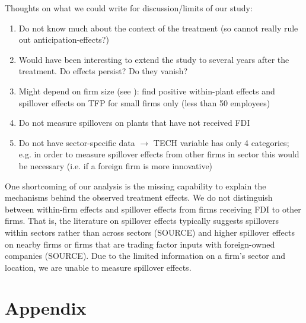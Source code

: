 \documentclass[a4paper,11pt]{scrartcl}
\newcommand{\sectionnumbering}[1]{%
  \setcounter{section}{0}%
   \renewcommand{\thesection}{\csname #1\endcsname{section}}}
\begin{document}
Thoughts on what we could write for discussion/limits of our study: 
\begin{enumerate}
\item Do not know much about the context of the treatment (so cannot really rule out anticipation-effects?)
\item Would have been interesting to extend the study to several years after the treatment. Do effects persist? Do they vanish? 
\item Might depend on firm size (see \citet{aitken99}): find positive within-plant effects and spillover effects on TFP for small firms only (less than 50 employees)
\item Do not measure spillovers on plants that have not received FDI
\item Do not have sector-specific data $\rightarrow$ TECH variable has only 4 categories; e.g. in order to measure spillover effects from other firms in sector this would be necessary (i.e. if a foreign firm is more innovative)
\end{enumerate}

One shortcoming of our analysis is the missing capability to explain the mechanisms behind the observed treatment effects. We do not distinguish between within-firm effects and spillover effects from firms receiving FDI to other firms. That is, the literature on spillover effects typically suggests spillovers within sectors rather than across sectors (SOURCE) and higher spillover effects on nearby firms or firms that are trading factor inputs with foreign-owned companies (SOURCE). Due to the limited information on a firm's sector and location, we are unable to measure spillover effects. 

\newpage

 
\newpage



\section*{Appendix}
\sectionnumbering{Roman}
\setcounter{page}{3} %
\end{document}
